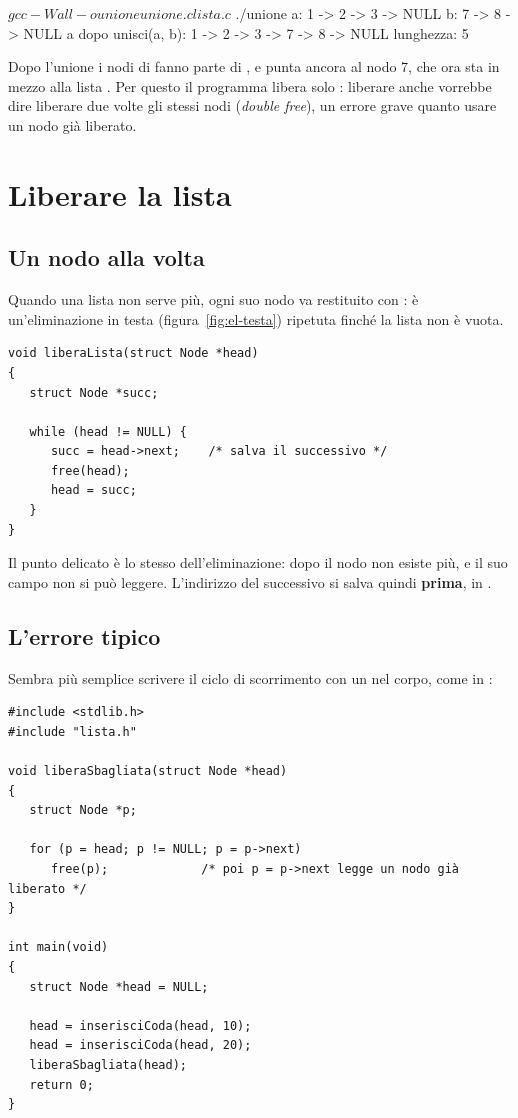\begin{console}
$ gcc -Wall -o unione unione.c lista.c
$ ./unione
a: 1 -> 2 -> 3 -> NULL
b: 7 -> 8 -> NULL
a dopo unisci(a, b): 1 -> 2 -> 3 -> 7 -> 8 -> NULL
lunghezza: 5
\end{console}

Dopo l'unione i nodi di  fanno parte di , e  punta
ancora al nodo 7, che ora sta in mezzo alla lista . Per questo il
programma libera solo : liberare anche  vorrebbe dire
liberare due volte gli stessi nodi (\textit{double free}), un errore grave
quanto usare un nodo già liberato.

\section{Liberare la lista}

\subsection{Un nodo alla volta}

Quando una lista non serve più, ogni suo nodo va restituito con :
è un'eliminazione in testa (figura~\ref{fig:el-testa}) ripetuta finché la
lista non è vuota.

\begin{affianco}[0.55][c]
\begin{lstlisting}[style=c, name=lista.c]
void liberaLista(struct Node *head)
{
   struct Node *succ;

   while (head != NULL) {
      succ = head->next;    /* salva il successivo */
      free(head);
      head = succ;
   }
}
\end{lstlisting}
\risultato
Il punto delicato è lo stesso dell'eliminazione: dopo  il
nodo non esiste più, e il suo campo  non si può leggere.
L'indirizzo del successivo si salva quindi \textbf{prima}, in .
\end{affianco}

\subsection{L'errore tipico}

Sembra più semplice scrivere il ciclo di scorrimento con un  nel
corpo, come in :

\begin{lstlisting}[style=c, name=libera_male.c]
#include <stdlib.h>
#include "lista.h"

void liberaSbagliata(struct Node *head)
{
   struct Node *p;

   for (p = head; p != NULL; p = p->next)
      free(p);             /* poi p = p->next legge un nodo già liberato */
}

int main(void)
{
   struct Node *head = NULL;

   head = inserisciCoda(head, 10);
   head = inserisciCoda(head, 20);
   liberaSbagliata(head);
   return 0;
}
\end{lstlisting}

